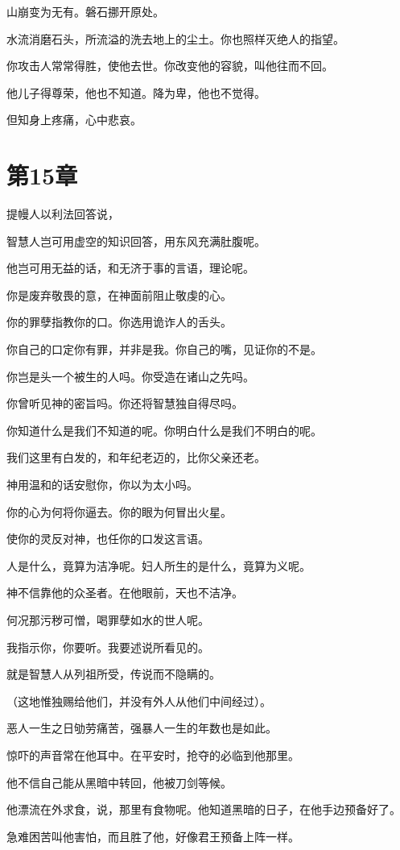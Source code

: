 \documentclass[12pt,oneside]{book}
\begin{document}
山崩变为无有。磐石挪开原处。

水流消磨石头，所流溢的洗去地上的尘土。你也照样灭绝人的指望。

你攻击人常常得胜，使他去世。你改变他的容貌，叫他往而不回。

他儿子得尊荣，他也不知道。降为卑，他也不觉得。

但知身上疼痛，心中悲哀。


\chapter{第15章}
提幔人以利法回答说，

智慧人岂可用虚空的知识回答，用东风充满肚腹呢。

他岂可用无益的话，和无济于事的言语，理论呢。

你是废弃敬畏的意，在神面前阻止敬虔的心。

你的罪孽指教你的口。你选用诡诈人的舌头。

你自己的口定你有罪，并非是我。你自己的嘴，见证你的不是。

你岂是头一个被生的人吗。你受造在诸山之先吗。

你曾听见神的密旨吗。你还将智慧独自得尽吗。

你知道什么是我们不知道的呢。你明白什么是我们不明白的呢。

我们这里有白发的，和年纪老迈的，比你父亲还老。

神用温和的话安慰你，你以为太小吗。

你的心为何将你逼去。你的眼为何冒出火星。

使你的灵反对神，也任你的口发这言语。

人是什么，竟算为洁净呢。妇人所生的是什么，竟算为义呢。

神不信靠他的众圣者。在他眼前，天也不洁净。

何况那污秽可憎，喝罪孽如水的世人呢。

我指示你，你要听。我要述说所看见的。

就是智慧人从列祖所受，传说而不隐瞒的。

（这地惟独赐给他们，并没有外人从他们中间经过）。

恶人一生之日劬劳痛苦，强暴人一生的年数也是如此。

惊吓的声音常在他耳中。在平安时，抢夺的必临到他那里。

他不信自己能从黑暗中转回，他被刀剑等候。

他漂流在外求食，说，那里有食物呢。他知道黑暗的日子，在他手边预备好了。

急难困苦叫他害怕，而且胜了他，好像君王预备上阵一样。
\end{document}
